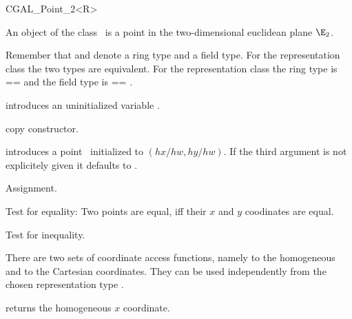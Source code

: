 
\begin {classtemplate} {CGAL_Point_2<R>}

An object of the class \classname\ is a point in the two-dimensional
euclidean plane $\E_2$. 



Remember that  and  denote a ring type
and a field type. For the representation class
 the two types are equivalent. For the
representation class  the ring type is
 ==  and the field type is  == 
.

\creation
{}


\hidden {}
             {introduces an uninitialized variable \var.}

\hidden {}
 	    {copy constructor.}

            {introduces a point \var\ initialized to $(hx/hw,hy/hw)$.
             If the third argument is not explicitely given it defaults
             to .}


\operations
\threecolumns{5cm}{4cm}

\hidden {}
        {Assignment.}

       {Test for equality: Two points are equal, iff their $x$ and $y$ 
        coodinates are equal.}

       {Test for inequality.}


There are two sets of coordinate access functions, namely to the
homogeneous and to the Cartesian coordinates. They can be used
independently from the chosen representation type .

       {returns the homogeneous $x$ coordinate.}


\end{classtemplate}
